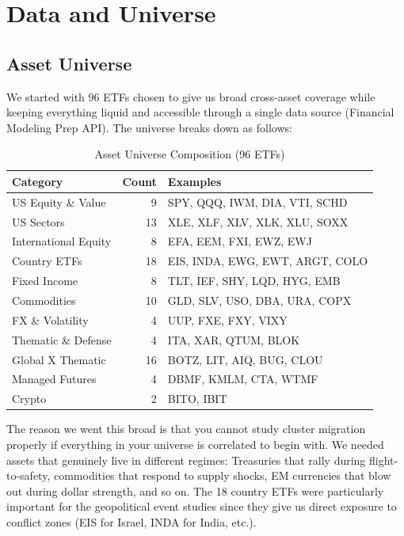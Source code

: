 \documentclass[12pt, letterpaper]{article}
\begin{document}
\section{Data and Universe}

\subsection{Asset Universe}

We started with 96 ETFs chosen to give us broad cross-asset coverage while keeping everything liquid and accessible through a single data source (Financial Modeling Prep API). The universe breaks down as follows:

\begin{table}[H]
\centering
\caption{Asset Universe Composition (96 ETFs)}
\begin{tabular}{@{}lrl@{}}
\toprule
\textbf{Category} & \textbf{Count} & \textbf{Examples} \\
\midrule
US Equity \& Value & 9 & SPY, QQQ, IWM, DIA, VTI, SCHD \\
US Sectors & 13 & XLE, XLF, XLV, XLK, XLU, SOXX \\
International Equity & 8 & EFA, EEM, FXI, EWZ, EWJ \\
Country ETFs & 18 & EIS, INDA, EWG, EWT, ARGT, COLO \\
Fixed Income & 8 & TLT, IEF, SHY, LQD, HYG, EMB \\
Commodities & 10 & GLD, SLV, USO, DBA, URA, COPX \\
FX \& Volatility & 4 & UUP, FXE, FXY, VIXY \\
Thematic \& Defense & 4 & ITA, XAR, QTUM, BLOK \\
Global X Thematic & 16 & BOTZ, LIT, AIQ, BUG, CLOU \\
Managed Futures & 4 & DBMF, KMLM, CTA, WTMF \\
Crypto & 2 & BITO, IBIT \\
\bottomrule
\end{tabular}
\end{table}

The reason we went this broad is that you cannot study cluster migration properly if everything in your universe is correlated to begin with. We needed assets that genuinely live in different regimes: Treasuries that rally during flight-to-safety, commodities that respond to supply shocks, EM currencies that blow out during dollar strength, and so on. The 18 country ETFs were particularly important for the geopolitical event studies since they give us direct exposure to conflict zones (EIS for Israel, INDA for India, etc.).
\end{document}

